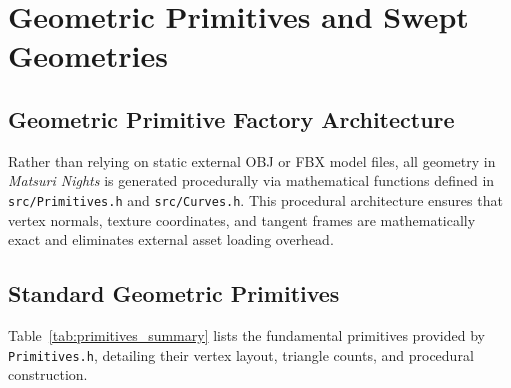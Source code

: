 \chapter{Geometric Primitives and Swept Geometries}
\label{chap:geometry}

\section{Geometric Primitive Factory Architecture}
Rather than relying on static external OBJ or FBX model files, all geometry in \textit{Matsuri Nights} is generated procedurally via mathematical functions defined in \texttt{src/Primitives.h} and \texttt{src/Curves.h}. This procedural architecture ensures that vertex normals, texture coordinates, and tangent frames are mathematically exact and eliminates external asset loading overhead.

\section{Standard Geometric Primitives}
Table~\ref{tab:primitives_summary} lists the fundamental primitives provided by \texttt{Primitives.h}, detailing their vertex layout, triangle counts, and procedural construction.

